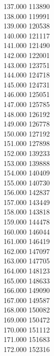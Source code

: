 { 137.000	113890 \\
 138.000	119991 \\
 139.000	120538 \\
 140.000	121117 \\
 141.000	121490 \\
 142.000	122001 \\
 143.000	123751 \\
 144.000	124718 \\
 145.000	124731 \\
 146.000	125051 \\
 147.000	125785 \\
 148.000	126192 \\
 149.000	126778 \\
 150.000	127192 \\
 151.000	127898 \\
 152.000	139233 \\
 153.000	139888 \\
 154.000	140409 \\
 155.000	140730 \\
 156.000	142837 \\
 157.000	143449 \\
 158.000	143818 \\
 159.000	144478 \\
 160.000	146044 \\
 161.000	146419 \\
 162.000	147097 \\
 163.000	147705 \\
 164.000	148123 \\
 165.000	148633 \\
 166.000	149090 \\
 167.000	149587 \\
 168.000	150082 \\
 169.000	150472 \\
 170.000	151112 \\
 171.000	151683 \\
 172.000	152316 \\
}
